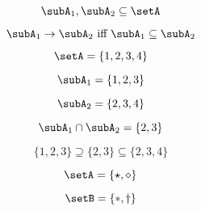 {\begin{forslides}
\begin{equation}\label{eq:prod-slides-14}
\subA_1, \subA_2 \subseteq \setA
\end{equation}

\begin{equation}\label{eq:prod-slides-15}
\subA_1 \to \subA_2 \text{ iff } \subA_1 \subseteq \subA_2
\end{equation}


\begin{equation}\label{eq:prod-slides-16}
\setA = \{ 1, 2, 3, 4 \}
\end{equation}

\begin{equation}\label{eq:prod-slides-17}
\subA_1 = \{ 1, 2, 3 \}
\end{equation}

\begin{equation}\label{eq:prod-slides-18}
\subA_2 = \{2, 3, 4 \}
\end{equation}

\begin{equation}\label{eq:prod-slides-19}
\subA_1 \cap \subA_2 = \{2, 3 \}
\end{equation}

\begin{equation}\label{eq:prod-slides-20}
\{ 1, 2, 3 \} \supseteq \{2, 3 \} \subseteq \{2, 3, 4 \}
\end{equation}

\begin{equation}\label{eq:coprod-slides-1}
\setA=\{\star, \diamond\}
\end{equation}

\begin{equation}\label{eq:coprod-slides-2}
\setB=\{\ast, \dagger\}
\end{equation}

\end{forslides}
}


